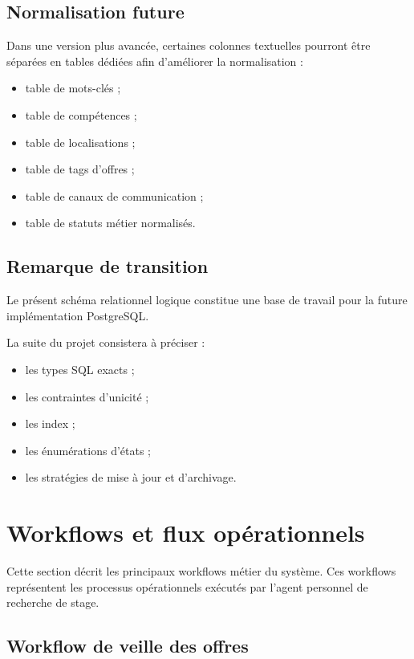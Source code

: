 \documentclass[11pt,a4paper]{article}
\begin{document}
\subsection{Normalisation future}

Dans une version plus avancée, certaines colonnes textuelles pourront être séparées en tables dédiées afin d’améliorer la normalisation :

\begin{itemize}
    \item table de mots-clés ;
    \item table de compétences ;
    \item table de localisations ;
    \item table de tags d’offres ;
    \item table de canaux de communication ;
    \item table de statuts métier normalisés.
\end{itemize}

\subsection{Remarque de transition}

Le présent schéma relationnel logique constitue une base de travail pour la future implémentation PostgreSQL.

La suite du projet consistera à préciser :

\begin{itemize}
    \item les types SQL exacts ;
    \item les contraintes d’unicité ;
    \item les index ;
    \item les énumérations d’états ;
    \item les stratégies de mise à jour et d’archivage.
\end{itemize}

\section{Workflows et flux opérationnels}

Cette section décrit les principaux workflows métier du système.  
Ces workflows représentent les processus opérationnels exécutés par l’agent personnel de recherche de stage.

\subsection{Workflow de veille des offres}
\end{document}
